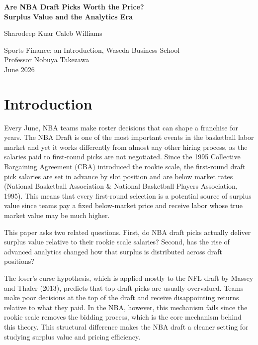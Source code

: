 \documentclass[12pt,letterpaper]{article}
\begin{document}
\begin{center}
  {\fontsize{18}{22}\bfseries Are NBA Draft Picks Worth the Price?\\[2pt]
   Surplus Value and the Analytics Era\par}
  \vspace{1.2em}
  {\normalsize Sharodeep Kuar \quad Caleb Williams\par}
  \vspace{0.4em}
  {\small Sports Finance: an Introduction, Waseda Business School\\
   Professor Nobuya Takezawa\\
   June 2026\par}
\end{center}
\thispagestyle{plain}
\vspace{1em}

\section{Introduction}

Every June, NBA teams make roster decisions that can shape a franchise for years. The NBA Draft is one of the most important events in the basketball labor market and yet it works differently from almost any other hiring process, as the salaries paid to first-round picks are not negotiated. Since the 1995 Collective Bargaining Agreement (CBA) introduced the rookie scale, the first-round draft pick salaries are set in advance by slot position and are below market rates (National Basketball Association \& National Basketball Players Association, 1995). This means that every first-round selection is a potential source of surplus value since teams pay a fixed below-market price and receive labor whose true market value may be much higher.

This paper asks two related questions. First, do NBA draft picks actually deliver surplus value relative to their rookie scale salaries? Second, has the rise of advanced analytics changed how that surplus is distributed across draft positions?

The loser's curse hypothesis, which is applied mostly to the NFL draft by Massey and Thaler (2013), predicts that top draft picks are usually overvalued. Teams make poor decisions at the top of the draft and receive disappointing returns relative to what they paid. In the NBA, however, this mechanism fails since the rookie scale removes the bidding process, which is the core mechanism behind this theory. This structural difference makes the NBA draft a cleaner setting for studying surplus value and pricing efficiency.
\end{document}
